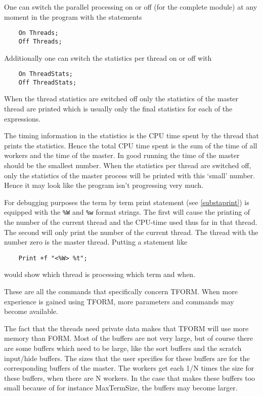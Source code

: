 One can switch the parallel processing on or off (for the complete module) 
at any moment in the program with the 
statements
\begin{verbatim}
    On Threads;
    Off Threads;
\end{verbatim}
Additionally one can switch the statistics per thread on or off with
\begin{verbatim}
    On ThreadStats;
    Off ThreadStats;
\end{verbatim}
When the thread statistics are 
switched off only the statistics of the master thread are printed which is 
usually only the final statistics for each of the expressions.

The timing information in the statistics is the CPU time 
spent by the thread that prints the statistics. Hence the total CPU time 
spent is the sum of the time of all workers and the time of the master. In 
good running the time of the master should be the smallest number. When the 
statistics per thread are switched off, only the statistics of the master 
process will be printed with this `small' number. Hence it may look like 
the program isn't progressing very much.

For debugging purposes the term by term print statement (see 
\ref{substaprint}) is equipped with the \verb:%W: and \verb:%w: format 
strings. The first will cause the printing of the number of the current 
thread and the CPU-time used thus far in that thread. The second will only 
print the number of the current thread. The thread with the number zero is 
the master thread. Putting a statement like
\begin{verbatim}
    Print +f "<%W> %t";
\end{verbatim}
would show which thread is processing which term and when.

These are all the commands that specifically concern TFORM. When more 
experience is gained using TFORM, more parameters and commands may become 
available.

The fact that the threads need private data makes that TFORM 
will use more memory than FORM. Most of the buffers are not very large, but 
of course there are some buffers which need to be large, like the sort 
buffers and the scratch input/hide buffers. The 
sizes that the user specifies for these buffers are for the corresponding 
buffers of the master. The workers get each 1/N times the size for these 
buffers, when there are N workers. In the case that makes these buffers too 
small because of for instance MaxTermSize, the buffers may become larger.


